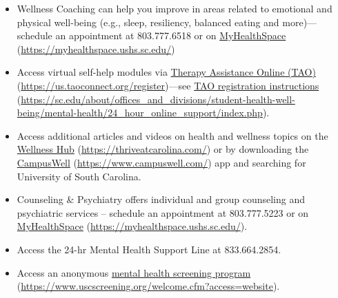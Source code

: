 \documentclass[11pt,letterpaper]{article}
\begin{document}
	\begin{itemize}
	\item Wellness Coaching can help you improve in areas related to emotional and physical well-being (e.g., sleep, resiliency, balanced eating and more)---schedule an appointment at 803.777.6518 or on \href{https://myhealthspace.ushs.sc.edu/}{MyHealthSpace} (\url{https://myhealthspace.ushs.sc.edu/})
	
	\item Access virtual self-help modules via \href{https://us.taoconnect.org/register}{Therapy Assistance Online (TAO)} (\url{https://us.taoconnect.org/register})---see \href{https://sc.edu/about/offices\_and\_divisions/student-health-well-being/mental-health/24\_hour\_online\_support/index.php}{TAO registration instructions} (\url{https://sc.edu/about/offices\_and\_divisions/student-health-well-being/mental-health/24\_hour\_online\_support/index.php}).
	
	\item Access additional articles and videos on health and wellness topics on the \href{https://thriveatcarolina.com/}{Wellness Hub} (\url{https://thriveatcarolina.com/}) or by downloading the \href{https://www.campuswell.com/}{CampusWell} (\url{https://www.campuswell.com/}) app and searching for University of South Carolina.
	
	\item Counseling \& Psychiatry offers individual and group counseling and psychiatric services – schedule an appointment at 803.777.5223 or on \href{https://myhealthspace.ushs.sc.edu/}{MyHealthSpace} (\url{https://myhealthspace.ushs.sc.edu/}).
	
	\item Access the 24-hr Mental Health Support Line at 833.664.2854.
	
	\item Access an anonymous \href{https://www.uscscreening.org/welcome.cfm?access=website}{mental health screening program} (\url{https://www.uscscreening.org/welcome.cfm?access=website}).
	\end{itemize} \par\vspace{0.4cm}



\end{document}
